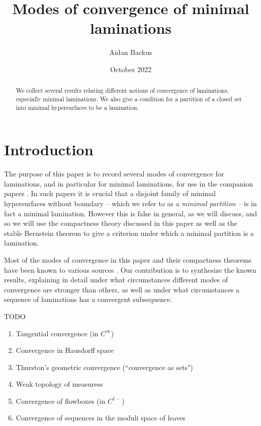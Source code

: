 \documentclass[reqno,10pt]{amsart}
\title{Modes of convergence of minimal laminations}
\author{Aidan Backus}
\date{October 2022}
\newcommand{\dfn}[1]{\emph{#1}\index{#1}}
\theoremstyle{definition}
\numberwithin{equation}{section}
\begin{document}
\begin{abstract}
We collect several results relating different notions of convergence of laminations, especially minimal laminations.
We also give a condition for a partition of a closed set into minimal hypersurfaces to be a lamination.
\end{abstract}

\maketitle



\section{Introduction}
The purpose of this paper is to record several modes of convergence for laminations, and in particular for minimal laminations, for use in the companion papers \cite{BackusFLG, DaskalopoulosPrep2}.
In such papers it is crucial that a disjoint family of minimal hypersurfaces without boundary -- which we refer to as a \dfn{minimal partition} -- is in fact a minimal lamination.
However this is false in general, as we will discuss, and so we will use the compactness theory discussed in this paper as well as the stable Bernstein theorem \cite{Schoen2016, Chodosh2021} to give a criterion under which a minimal partition is a lamination.

Most of the modes of convergence in this paper and their compactness theorems have been known to various sources \cite{ColdingMinicozziIV, ColdingMinicozziV, thurston1979geometry}.
Our contribution is to synthesize the known results, explaining in detail under what circumstances different modes of convergence are stronger than others, as well as under what circumstances a sequence of laminations has a convergent subsequence.


TODO

\begin{enumerate}
\item Tangential convergence (in $C^\infty$)
\item Convergence in Hausdorff space
\item Thurston's geometric convergence (``convergence as sets")
\item Weak topology of measuress
\item Convergence of flowboxes (in $C^{1-}$)
\item Convergence of sequences in the moduli space of leaves
\end{enumerate}
\end{document}
